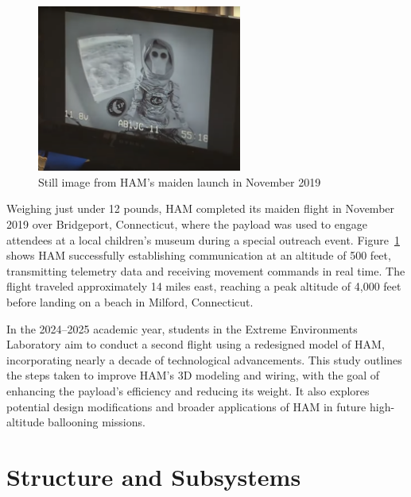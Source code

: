 \begin{figure}[H]
    \centering
    \includegraphics[width = 0.6\textwidth]{Figures/HAM_Original_Flight.png}
    \caption{Still image from HAM’s maiden launch in November 2019}
    \label{Fig:HAB_2019_Flight}
\end{figure}
\vspace{-2em}  %
Weighing just under 12 pounds, HAM completed its maiden flight in November 2019 over Bridgeport, Connecticut, where the payload was used to engage attendees at a local children's museum during a special outreach event. Figure~\ref{Fig:HAB_2019_Flight} shows HAM successfully establishing communication at an altitude of 500 feet, transmitting telemetry data and receiving movement commands in real time. The flight traveled approximately 14 miles east, reaching a peak altitude of 4,000 feet before landing on a beach in Milford, Connecticut. \par

In the 2024–2025 academic year, students in the Extreme Environments Laboratory aim to conduct a second flight using a redesigned model of HAM, incorporating nearly a decade of technological advancements. This study outlines the steps taken to improve HAM's 3D modeling and wiring, with the goal of enhancing the payload's efficiency and reducing its weight. It also explores potential design modifications and broader applications of HAM in future high-altitude ballooning missions.

\vspace{-2em}
\section{Structure and Subsystems}
\vspace{-2em}

